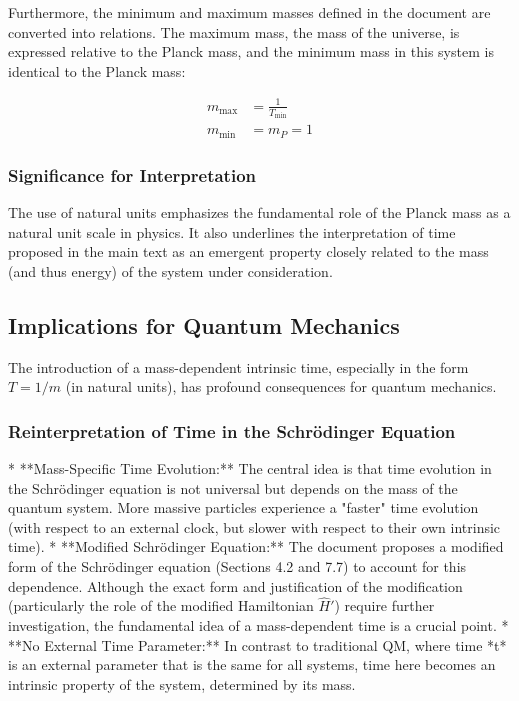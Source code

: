 \documentclass{article}
\begin{document}
	Furthermore, the minimum and maximum masses defined in the document are converted into relations. The maximum mass, the mass of the universe, is expressed relative to the Planck mass, and the minimum mass in this system is identical to the Planck mass:
	
	\begin{align}
		m_{\text{max}} &= \frac{1}{T_{\text{min}}}\\
		m_{\text{min}} &= m_P = 1
	\end{align}
	
	\subsubsection{Significance for Interpretation}
	
	The use of natural units emphasizes the fundamental role of the Planck mass as a natural unit scale in physics. It also underlines the interpretation of time proposed in the main text as an emergent property closely related to the mass (and thus energy) of the system under consideration.
	
	\subsection{Implications for Quantum Mechanics}
	
	The introduction of a mass-dependent intrinsic time, especially in the form $T = 1/m$ (in natural units), has profound consequences for quantum mechanics.
	
	\subsubsection{Reinterpretation of Time in the Schrödinger Equation}
	
	*   **Mass-Specific Time Evolution:** The central idea is that time evolution in the Schrödinger equation is not universal but depends on the mass of the quantum system. More massive particles experience a "faster" time evolution (with respect to an external clock, but slower with respect to their own intrinsic time).
	*   **Modified Schrödinger Equation:** The document proposes a modified form of the Schrödinger equation (Sections 4.2 and 7.7) to account for this dependence. Although the exact form and justification of the modification (particularly the role of the modified Hamiltonian $\hat{H}'$) require further investigation, the fundamental idea of a mass-dependent time is a crucial point.
	*   **No External Time Parameter:** In contrast to traditional QM, where time *t* is an external parameter that is the same for all systems, time here becomes an intrinsic property of the system, determined by its mass.
	
\end{document}
